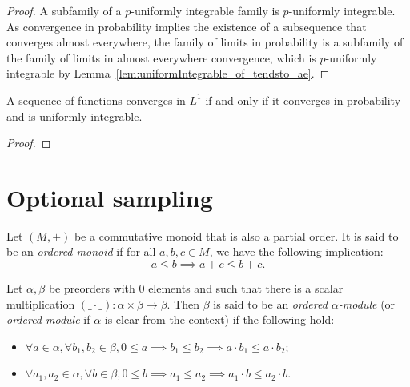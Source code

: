 \begin{proof}
  \leanok
  A subfamily of a $p$-uniformly integrable family is $p$-uniformly integrable. As convergence in probability implies the existence of a subsequence that converges almost everywhere, the family of limits in probability is a subfamily of the family of limits in almost everywhere convergence, which is $p$-uniformly integrable by Lemma~\ref{lem:uniformIntegrable_of_tendsto_ae}.
\end{proof}

\begin{lemma}\label{lem:vitali}
  \mathlibok
  A sequence of functions converges in $L^1$ if and only if it converges in probability and is uniformly integrable.
\end{lemma}

\begin{proof}\leanok

\end{proof}

\section{Optional sampling}

\begin{definition}\label{def:isOrderedAddMonoid}
  \mathlibok
Let $(M, +)$ be a commutative monoid that is also a partial order. It is said to be an \emph{ordered monoid} if for all $a, b, c \in M$, we have the following implication:
$$a \le b \implies a + c \le b + c.$$
\end{definition}

\begin{definition}\label{def:isOrderedModule}
  \mathlibok
Let $\alpha, \beta$ be preorders with $0$ elements and such that there is a scalar multiplication $(\_ \cdot \_) : \alpha \times \beta \to \beta$. Then $\beta$ is said to be an \emph{ordered $\alpha$-module} (or \emph{ordered module} if $\alpha$ is clear from the context) if the following hold:
\begin{itemize}
  \item $\forall a \in \alpha, \forall b_1, b_2 \in \beta, 0 \le a \implies b_1 \le b_2 \implies a \cdot b_1 \le a \cdot b_2$;
  \item $\forall a_1, a_2 \in \alpha, \forall b \in \beta, 0 \le b \implies a_1 \le a_2 \implies a_1 \cdot b \le a_2 \cdot b$.
\end{itemize}
\end{definition}

